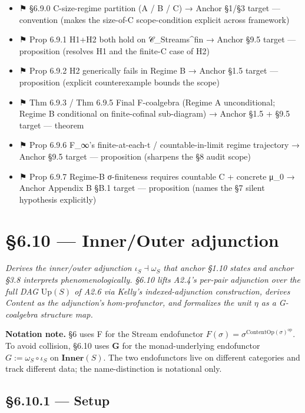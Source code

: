 \documentclass[11pt, openany]{book}
\newcommand{\sectionbreak}{\clearpage}
\begin{document}
\begin{itemize}
\item ⚑ §6.9.0 C-size-regime partition (A / B / C) → Anchor §1/§3 target --- convention (makes the size-of-C scope-condition explicit across framework)
\item ⚑ Prop 6.9.1 H1+H2 both hold on 𝒞\_\allowbreak{}Streams\textasciicircum{}{fin} → Anchor §9.5 target --- proposition (resolves H1 and the finite-C case of H2)
\item ⚑ Prop 6.9.2 H2 generically fails in Regime B → Anchor §1.5 target --- proposition (explicit counterexample bounds the scope)
\item ⚑ Thm 6.9.3 / Thm 6.9.5 Final F-coalgebra (Regime A unconditional; Regime B conditional on finite-cofinal sub-diagram) → Anchor §1.5 + §9.5 target --- theorem
\item ⚑ Prop 6.9.6 F\_\allowbreak{}∞'s finite-at-each-t / countable-in-limit regime trajectory → Anchor §9.5 target --- proposition (sharpens the §8 audit scope)
\item ⚑ Prop 6.9.7 Regime-B σ-finiteness requires countable C + concrete μ\_\allowbreak{}0 → Anchor Appendix B §B.1 target --- proposition (names the §7 silent hypothesis explicitly)
\end{itemize}

\sectionbreak

\section{§6.10 --- Inner/Outer adjunction}

\textit{Derives the inner/outer adjunction $\iota_S \dashv \omega_S$ that anchor §1.10 states and anchor §3.8 interprets phenomenologically. §6.10 lifts A2.4's per-pair adjunction over the full DAG $\mathrm{Up}(S)$ of A2.6 via Kelly's indexed-adjunction construction, derives Content as the adjunction's hom-profunctor, and formalizes the unit $\eta$ as a G-coalgebra structure map.}

\textbf{Notation note.} §6 uses F for the Stream endofunctor $F(\sigma) = \sigma^{\mathrm{ContentOp}(\sigma)^{\mathrm{op}}}$. To avoid collision, §6.10 uses \textbf{G} for the monad-underlying endofunctor $G := \omega_S \circ \iota_S$ on $\mathbf{Inner}(S)$. The two endofunctors live on different categories and track different data; the name-distinction is notational only.

\subsection{§6.10.1 --- Setup}
\end{document}
